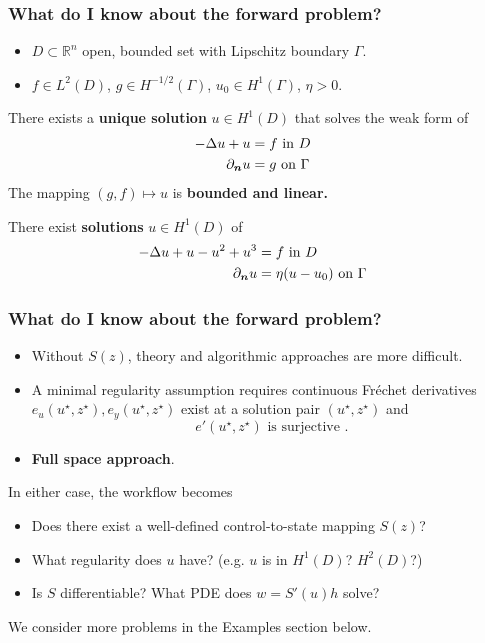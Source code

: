 \documentclass[aspectratio=169,xcolor=dvipsnames,10pt]{beamer}
\begin{document}
\begin{frame}\frametitle{What do I know about the forward problem?}
\begin{block}{}
\begin{itemize}
\item $D \subset \mathbb R^n$ open, bounded set with Lipschitz boundary $\Gamma$.
\item $f \in L^2(D)$, $g \in H^{-1/2}(\Gamma)$, $u_0 \in H^1(\Gamma)$, $\eta > 0$.
\end{itemize}
\end{block}
\begin{example}
There exists a \textbf{unique solution} $u \in H^1(D)$ that solves the weak form of 
\[
\aligned
-\Delta u + u        &= f \text{ in } D&\\
\partial_{\bm n} u &= g \text{ on } \Gamma&
\endaligned
\]
The mapping $(g,f) \mapsto u$ is \textbf{bounded and linear.}
\end{example}\pause
\begin{example}
There exist \textbf{solutions} $u \in H^1(D)$ of 
\[
\aligned
-\Delta u +  u -  u^2 + u^3 &= f \text{ in } D&\\
\partial_{\bm n} u &= \eta(u - u_{0}) \text{ on } \Gamma&
\endaligned
\]
\end{example}
\end{frame}

\begin{frame}\frametitle{What do I know about the forward problem?}
\begin{block}{}
\begin{itemize}
\item Without $S(z)$, theory and algorithmic approaches are more difficult. 
\item A minimal regularity assumption requires continuous Fr\'echet derivatives $e_u(u^{\star},z^{\star}), e_y(u^{\star},z^{\star})$ exist at a solution pair $(u^{\star},z^{\star})$ and 
\[
e'(u^{\star},z^{\star}) \text{ is surjective }.
\]
\item \textbf{Full space approach}.
\end{itemize}
\end{block}
\begin{block}{}
In either case, the workflow becomes 
\begin{itemize}
\item Does there exist a well-defined control-to-state mapping $S(z)$?
\item What regularity does $u$ have? (e.g. $u$ is in $H^1(D)$? $H^2(D)$?)
\item Is $S$ differentiable? What PDE does $w = S'(u) h$ solve?
\end{itemize}
\end{block}
\begin{block}{}
\centering We consider more problems in the Examples section below.
\end{block}
\end{frame}
\end{document}
